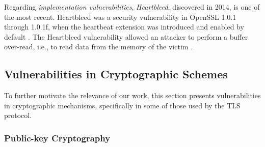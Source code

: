 \documentclass{sig-alternate-05-2015}
\begin{document}

Regarding \emph{implementation vulnerabilities}, \textit{Heartbleed}, discovered in 2014, is one of the most recent. %
Heartbleed was a security vulnerability in OpenSSL 1.0.1 through 1.0.1f, when the heartbeat extension was introduced and enabled by default \cite{heartbeat-extension}. The Heartbleed vulnerability allowed an attacker to perform a buffer over-read, i.e., to read data from the memory of the victim \cite{Carvalho2014-HB}. %
%
%


\subsection{Vulnerabilities in Cryptographic Schemes}

To further motivate the relevance of our work, 
this section presents  vulnerabilities in cryptographic mechanisms, specifically in some of those used by the TLS protocol. %

\subsubsection{Public-key Cryptography}
\end{document}
